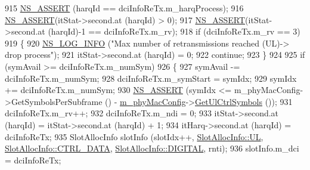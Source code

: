 \begin{DoxyCode}
915                                 \hyperlink{assert_8h_a6dccdb0de9b252f60088ce281c49d052}{NS\_ASSERT} (harqId == dciInfoReTx.m\_harqProcess);
916                                 \hyperlink{assert_8h_a6dccdb0de9b252f60088ce281c49d052}{NS\_ASSERT}(itStat->second.at (harqId) > 0);
917                                 \hyperlink{assert_8h_a6dccdb0de9b252f60088ce281c49d052}{NS\_ASSERT}(itStat->second.at (harqId)-1 == dciInfoReTx.m\_rv);
918                                 \textcolor{keywordflow}{if} (dciInfoReTx.m\_rv == 3)
919                                 \{
920                                         \hyperlink{group__logging_gafbd73ee2cf9f26b319f49086d8e860fb}{NS\_LOG\_INFO} (\textcolor{stringliteral}{"Max number of retransmissions reached
       (UL)-> drop process"});
921                                         itStat->second.at (harqId) = 0;
922                                         \textcolor{keywordflow}{continue};
923                                 \}
924 
925                                 \textcolor{keywordflow}{if} (symAvail >= dciInfoReTx.m\_numSym)
926                                 \{
927                                         symAvail -= dciInfoReTx.m\_numSym;
928                                         dciInfoReTx.m\_symStart = symIdx;
929                                         symIdx += dciInfoReTx.m\_numSym;
930                                         \hyperlink{assert_8h_a6dccdb0de9b252f60088ce281c49d052}{NS\_ASSERT} (symIdx <= m\_phyMacConfig->GetSymbolsPerSubframe
       () - \hyperlink{classns3_1_1MmWaveMacScheduler_a24d7af4971d2e500fe543cefbafa2fd9}{m\_phyMacConfig}->\hyperlink{classns3_1_1MmWavePhyMacCommon_aa0bf8af14050bc5dc6513fbc86319a9b}{GetUlCtrlSymbols} ());
931                                         dciInfoReTx.m\_rv++;
932                                         dciInfoReTx.m\_ndi = 0;
933                                         itStat->second.at (harqId) = itStat->second.at (harqId) + 1;
934                                         itHarq->second.at (harqId) = dciInfoReTx;
935                                         SlotAllocInfo slotInfo (slotIdx++, 
      \hyperlink{structns3_1_1SlotAllocInfo_a6cad60db1d39034f1851e2cea625fe5da916b5be54594ead6ed677c570311cad2}{SlotAllocInfo::UL}, \hyperlink{structns3_1_1SlotAllocInfo_a3ea7cb503bfd0c9a4df55a71b81b9331a1ea636c3f068558fabacbc39934309b8}{SlotAllocInfo::CTRL\_DATA}, 
      \hyperlink{structns3_1_1SlotAllocInfo_adcbd067d82be6260b3399167d8f0b4eca47a67c342db658a08ded9ce4b49417ea}{SlotAllocInfo::DIGITAL}, rnti);
936                                         slotInfo.m\_dci = dciInfoReTx;

\end{DoxyCode}

